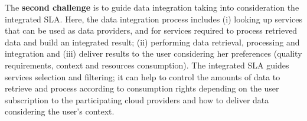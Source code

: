 \documentclass[11pt,a4paper,oneside]{report}
\begin{document}
The \textbf{second challenge} is to guide data integration taking into consideration the integrated SLA. Here, the data integration process includes (i) looking up services that can be used as data providers, and for services required to process retrieved data and build an integrated result; (ii) performing data retrieval, processing and integration and (iii) deliver results to the user considering her preferences (quality requirements, context and resources consumption). The integrated SLA guides services selection and filtering; it can help to control the amounts of data to retrieve and process according to consumption rights depending on the user subscription to the participating cloud providers and how to deliver data considering the user's context.


\end{document}
